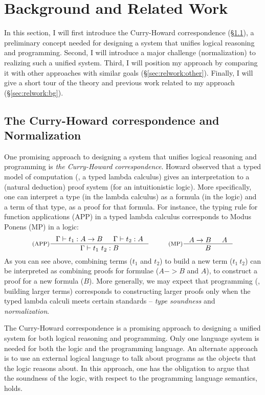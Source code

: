 \section{Background and Related Work}\label{sec:relwork}

In this section, I will first introduce the Curry-Howard correspondence 
(\S\ref{sec:relwork:prelim}), a preliminary concept needed for designing
a system that unifies logical reasoning and programming. Second, I will
introduce a major challenge (normalization) to realizing such a unified system.
Third, I will position my approach by comparing it with other approaches with
similar goals (\S\ref{sec:relwork:other}). Finally, I will give a short tour of
the theory and previous work related to my approach (\S\ref{sec:relwork:bg}).

\subsection{The Curry-Howard correspondence and Normalization}
\label{sec:relwork:prelim}
One promising approach to designing a system that unifies
logical reasoning and programming is \emph{the Curry-Howard correspondence}.
Howard \cite{Howard69} observed that a typed model of computation
(\ie, a typed lambda calculus) gives an interpretation to a (natural deduction)
proof system (for an intuitionistic logic). More specifically, one can interpret
a type (in the lambda calculus) as a formula (in the logic) and
a term of that type, as a proof for that formula. For instance,
the typing rule for function applications (APP) in a typed lambda calculus
corresponds to Modus Ponens (MP) in a logic:
\[ \inference[(APP)]
      {\Gamma |- t_1 : A -> B & \Gamma |- t_2 : A}
      {\Gamma |- t_1~t_2 : B}
 ~~~~~~~~
   \inference[(MP)]
      {A -> B & A}
      {B}
\]
As you can see above, combining terms ($t_1$ and $t_2$) to build a new term
($t_1~t_2$) can be interpreted as combining proofs for formulae
($A -> B$ and $A$), to construct a proof for a new formula ($B$).
More generally, we may expect that programming (\ie, building larger terms)
corresponds to constructing larger proofs only when the typed lambda calculi
meets certain standards -- \emph{type soundness} and \emph{normalization}.

The Curry-Howard correspondence is a promising approach to designing a
unified system for both logical reasoning and programming. Only one language
system is needed for both the logic and the programming language. An
alternate approach is to use an external logical language to talk about
programs as the objects that the logic reasons about. In this approach, one
has the obligation to argue that the soundness of the logic, with respect to
the programming language semantics, holds.

